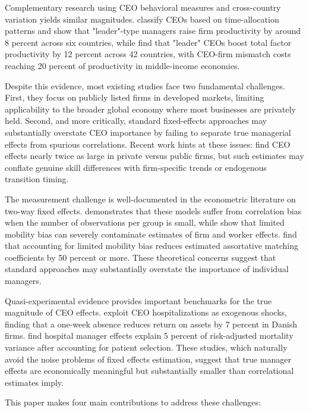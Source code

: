 \documentclass[11pt,a4paper]{article}
\begin{document}
Complementary research using CEO behavioral measures and cross-country variation yields similar magnitudes. \citet{bandiera2020ceo} classify CEOs based on time-allocation patterns and show that "leader"-type managers raise firm productivity by around 8 percent across six countries, while \citet{dahlstrand2025ceo} find that "leader" CEOs boost total factor productivity by 12 percent across 42 countries, with CEO-firm mismatch costs reaching 20 percent of productivity in middle-income economies.

Despite this evidence, most existing studies face two fundamental challenges. First, they focus on publicly listed firms in developed markets, limiting applicability to the broader global economy where most businesses are privately held. Second, and more critically, standard fixed-effects approaches may substantially overstate CEO importance by failing to separate true managerial effects from spurious correlations. Recent work hints at these issues: \citet{quigley2022does} find CEO effects nearly twice as large in private versus public firms, but such estimates may conflate genuine skill differences with firm-specific trends or endogenous transition timing.

The measurement challenge is well-documented in the econometric literature on two-way fixed effects. \citet{gaure2014correlation} demonstrates that these models suffer from correlation bias when the number of observations per group is small, while \citet{bonhomme2023much} show that limited mobility bias can severely contaminate estimates of firm and worker effects. \citet{andrews2008high} find that accounting for limited mobility bias reduces estimated assortative matching coefficients by 50 percent or more. These theoretical concerns suggest that standard approaches may substantially overstate the importance of individual managers.

Quasi-experimental evidence provides important benchmarks for the true magnitude of CEO effects. \citet{bennedsen2020ceos} exploit CEO hospitalizations as exogenous shocks, finding that a one-week absence reduces return on assets by 7 percent in Danish firms. \citet{chandra2016health} find hospital manager effects explain 5 percent of risk-adjusted mortality variance after accounting for patient selection. These studies, which naturally avoid the noise problems of fixed effects estimation, suggest that true manager effects are economically meaningful but substantially smaller than correlational estimates imply.

This paper makes four main contributions to address these challenges:
\end{document}
